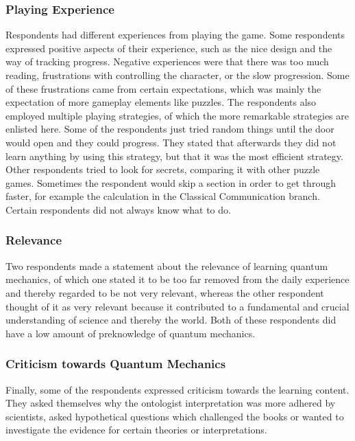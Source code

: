 \documentclass[11pt,twoside]{report} %
\begin{document}
\subsubsection{Playing Experience}

Respondents had different experiences from playing the game. Some respondents expressed positive aspects of their experience, such as the nice design and the way of tracking progress. Negative experiences were that there was too much reading, frustrations with controlling the character, or the slow progression. Some of these frustrations came from certain expectations, which was mainly the expectation of more gameplay elements like puzzles. The respondents also employed multiple playing strategies, of which the more remarkable strategies are enlisted here. Some of the respondents just tried random things until the door would open and they could progress. They stated that afterwards they did not learn anything by using this strategy, but that it was the most efficient strategy. Other respondents tried to look for secrets, comparing it with other puzzle games. Sometimes the respondent would skip a section in order to get through faster, for example the calculation in the Classical Communication branch. Certain respondents did not always know what to do.

\subsubsection{Relevance}

Two respondents made a statement about the relevance of learning quantum mechanics, of which one stated it to be too far removed from the daily experience and thereby regarded to be not very relevant, whereas the other respondent thought of it as very relevant because it contributed to a fundamental and crucial understanding of science and thereby the world. Both of these respondents did have a low amount of preknowledge of quantum mechanics.

\subsubsection{Criticism towards Quantum Mechanics}

Finally, some of the respondents expressed criticism towards the learning content. They asked themselves why the ontologist interpretation was more adhered by scientists, asked hypothetical questions which challenged the books or wanted to investigate the evidence for certain theories or interpretations.
\end{document}
